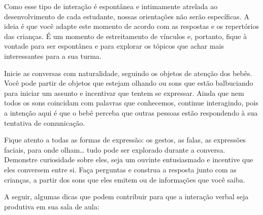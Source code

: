 \documentclass[11pt]{extarticle}
\begin{document}
Como esse tipo de interação é espontânea e intimamente atrelada ao 
desenvolvimento de cada estudante, nossas orientações não serão específicas. 
A ideia é que você adapte este momento de acordo com as respostas e os 
repertórios das crianças. É um momento de estreitamento de vínculos e, portanto, 
fique à vontade para ser espontânea e para explorar os tópicos que achar 
mais interessantes para a sua turma.

Inicie as conversas com naturalidade, seguindo os objetos de atenção dos bebês. 
Você pode partir de objetos que estejam olhando ou sons que estão balbuciando 
para iniciar um assunto e incentivar que tentem se expressar. Ainda que nem 
todos os sons coincidam com palavras que conhecemos, continue interagindo, 
pois a intenção aqui é que o bebê perceba que outras pessoas estão respondendo 
à sua tentativa de comunicação. 

Fique atento a todas as formas de expressão: os gestos, as falas, as 
expressões faciais, para onde olham\ldots{} tudo pode ser explorado durante a conversa. 
Demonstre curiosidade sobre eles, seja um ouvinte entusiasmado e incentive que eles 
conversem entre si. Faça perguntas e construa a resposta junto com as crianças, 
a partir dos sons que eles emitem ou de informações que você saiba. 

A seguir, algumas dicas que podem contribuir para que a interação verbal 
seja produtiva em sua sala de aula: 
\end{document}
